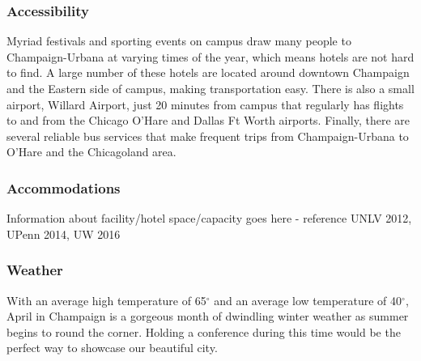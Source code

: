 \subsubsection{Accessibility}
Myriad festivals and sporting events on campus draw many people to Champaign-Urbana at varying times of the year, which means hotels are not hard to find. A large number of these hotels are located around downtown Champaign and the Eastern side of campus, making transportation easy. There is also a small airport, Willard Airport, just 20 minutes from campus that regularly has flights to and from the Chicago O’Hare and Dallas Ft Worth airports. Finally, there are several reliable bus services that make frequent trips from Champaign-Urbana to O’Hare and the Chicagoland area.

\subsubsection{Accommodations}
Information about facility/hotel space/capacity goes here - reference UNLV 2012, UPenn 2014, UW 2016

\subsubsection{Weather}
With an average high temperature of 65$^{\circ}$ and an average low temperature of 40$^{\circ}$, April in Champaign is a gorgeous month of dwindling winter weather as summer begins to round the corner. Holding a conference during this time would be the perfect way to showcase our beautiful city.

